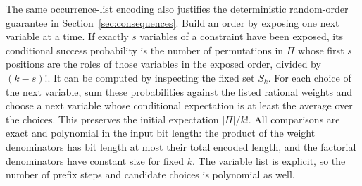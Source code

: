 The same occurrence-list encoding also justifies the deterministic
random-order guarantee in Section~\ref{sec:consequences}.  Build an
order by exposing one next variable at a time.  If exactly \(s\)
variables of a constraint have been exposed, its conditional success
probability is the number of permutations in \(\Pi\) whose first
\(s\) positions are the roles of those variables in the exposed order, divided by
\((k-s)!\).  It can be computed by inspecting the fixed set \(S_k\).
For each choice of the next variable, sum these probabilities against
the listed rational weights and choose a next variable whose conditional
expectation is at least the average over the choices.
This preserves the initial expectation \(|\Pi|/k!\).  All comparisons
are exact and polynomial in the input bit length: the product of the
weight denominators has bit length at most their total encoded length,
and the factorial denominators have constant size for fixed \(k\).
The variable list is explicit, so the number of prefix steps and
candidate choices is polynomial as well.
